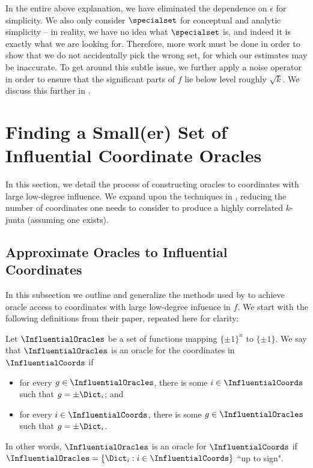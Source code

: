 In the entire above explanation, we have eliminated the dependence on $\epsilon$ for simplicity. We also only consider $\specialset$ for conceptual and analytic simplicity -- in reality, we have no idea what $\specialset$ is, and indeed it is exactly what we are looking for. Therefore, more work must be done in order to show that we do not accidentally pick the wrong set, for which our estimates may be inaccurate. To get around this subtle issue, we further apply a noise operator in order to ensure that the significant parts of $f$ lie below level roughly $\sqrt{k}$. We discuss this further in .



\section{Finding a Small(er) Set of  Influential Coordinate Oracles}
\label{section:improving-dmn}
In this section, we detail the process of constructing oracles to coordinates with large low-degree influence. We expand upon the techniques in \cite{junta-coordinate-oracles}, reducing the number of coordinates one needs to consider to produce a highly correlated $k$-junta (assuming one exists). 
\subsection{Approximate Oracles to Influential Coordinates}
\label{subsection:approx-oracles}
In this subsection we outline and generalize the methods used by \cite{junta-coordinate-oracles} to achieve oracle access to coordinates with large low-degree infuence in $f$. We start with the following definitions from their paper, repeated here for clarity:

\begin{definition}
Let $\InfluentialOracles$ be a set of functions mapping $\{ \pm 1\}^n$ to $\{ \pm 1\}$. We say that $\InfluentialOracles$ is an oracle for the coordinates in $\InfluentialCoords$ if 
\begin{itemize}
    \item for every $g \in \InfluentialOracles$, there is some $i \in \InfluentialCoords$ such that $g = \pm \Dict_i$; and
    \item for every $i \in \InfluentialCoords$, there is some $g \in \InfluentialOracles$ such that $g = \pm \Dict_i$.
\end{itemize}
In other words, $\InfluentialOracles$ is an oracle for $\InfluentialCoords$ if $\InfluentialOracles = \{ \Dict_i : i \in \InfluentialCoords\}$ ``up to sign".
\end{definition}

